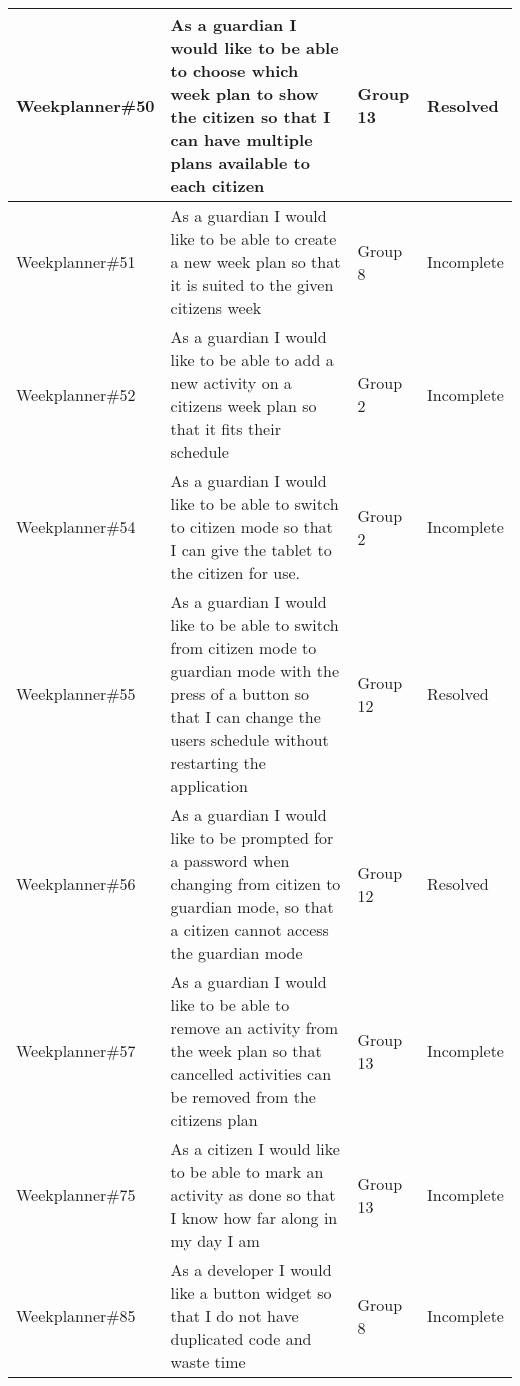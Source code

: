 \begin{longtable}{|p{2.8cm}|p{7cm}|p{1.5cm}|p{1.8cm}|}
    Weekplanner\#50 & As a guardian I would like to be able to choose which week plan to show the citizen so that I can have multiple plans available to each citizen                                          & Group 13        & Resolved\\ \hline
    Weekplanner\#51 & As a guardian I would like to be able to create a new week plan so that it is suited to the given citizens week                                                                          & Group 8         & Incomplete    \\ \hline
    Weekplanner\#52 & As a guardian I would like to be able to add a new activity on a citizens week plan so that it fits their schedule                                                                       & Group 2         & Incomplete    \\ \hline
    Weekplanner\#54 & As a guardian I would like to be able to switch to citizen mode so that I can give the tablet to the citizen for use.                                                                    & Group 2         & Incomplete    \\ \hline
    Weekplanner\#55 & As a guardian I would like to be able to switch from citizen mode to guardian mode with the press of a button so that I can change the users schedule without restarting the application & Group 12        & Resolved    \\ \hline
    Weekplanner\#56 & As a guardian I would like to be prompted for a password when changing from citizen to guardian mode, so that a citizen cannot access the guardian mode                                  & Group 12        & Resolved    \\ \hline
    Weekplanner\#57 & As a guardian I would like to be able to remove an activity from the week plan so that cancelled activities can be removed from the citizens plan                                        & Group 13        & Incomplete    \\ \hline
    Weekplanner\#75 & As a citizen I would like to be able to mark an activity as done so that I know how far along in my day I am                                                                             & Group 13        & Incomplete    \\ \hline
    Weekplanner\#85 & As a developer I would like a button widget so that I do not have duplicated code and waste time                                                                                         & Group 8         & Incomplete    \\ \hline

\end{longtable}
